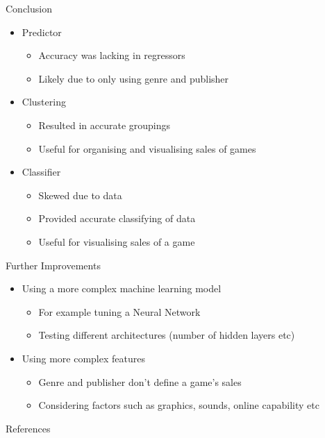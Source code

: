 \documentclass{beamer}
\begin{document}

\begin{frame}{Conclusion}

\begin{itemize}
    \item Predictor
    \begin{itemize}
        \item Accuracy was lacking in regressors
        \item Likely due to only using genre and publisher
    \end{itemize}
    \vspace{3mm}
    \item Clustering
    \begin{itemize}
        \item Resulted in accurate groupings
        \item Useful for organising and visualising sales of games
    \end{itemize}
    \vspace{3mm}
    \item Classifier
    \begin{itemize}
        \item Skewed due to data
        \item Provided accurate classifying of data
        \item Useful for visualising sales of a game
    \end{itemize}
\end{itemize}

\end{frame}


\begin{frame}{Further Improvements}

\begin{itemize}
    \item Using a more complex machine learning model
    \begin{itemize}
        \item For example tuning a Neural Network
        \item Testing different architectures (number of hidden layers etc)
    \end{itemize}
    \vspace{3mm}
    \item Using more complex features
    \begin{itemize}
        \item Genre and publisher don't define a game's sales 
        \item Considering factors such as graphics, sounds, online capability etc
    \end{itemize}
\end{itemize}

\end{frame}


\begin{frame}{References}



    
\end{frame}
\end{document}
